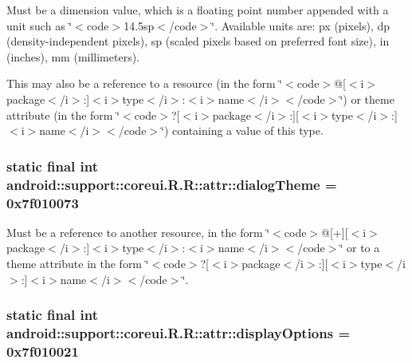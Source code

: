 Must be a dimension value, which is a floating point number appended with a unit such as \char`\"{}$<$code$>$14.5sp$<$/code$>$\char`\"{}. Available units are: px (pixels), dp (density-independent pixels), sp (scaled pixels based on preferred font size), in (inches), mm (millimeters). 

This may also be a reference to a resource (in the form \char`\"{}$<$code$>$@\mbox{[}$<$i$>$package$<$/i$>$:\mbox{]}$<$i$>$type$<$/i$>$:$<$i$>$name$<$/i$>$$<$/code$>$\char`\"{}) or theme attribute (in the form \char`\"{}$<$code$>$?\mbox{[}$<$i$>$package$<$/i$>$:\mbox{]}\mbox{[}$<$i$>$type$<$/i$>$:\mbox{]}$<$i$>$name$<$/i$>$$<$/code$>$\char`\"{}) containing a value of this type. \hypertarget{classandroid_1_1support_1_1coreui_1_1_r_1_1attr_c1a4a47c3610620157e83b571db613c9}{
\subsubsection[{dialogTheme}]{\setlength{\rightskip}{0pt plus 5cm}static final int android::support::coreui.R.R::attr::dialogTheme = 0x7f010073}}
\label{classandroid_1_1support_1_1coreui_1_1_r_1_1attr_c1a4a47c3610620157e83b571db613c9}


Must be a reference to another resource, in the form \char`\"{}$<$code$>$@\mbox{[}+\mbox{]}\mbox{[}$<$i$>$package$<$/i$>$:\mbox{]}$<$i$>$type$<$/i$>$:$<$i$>$name$<$/i$>$$<$/code$>$\char`\"{} or to a theme attribute in the form \char`\"{}$<$code$>$?\mbox{[}$<$i$>$package$<$/i$>$:\mbox{]}\mbox{[}$<$i$>$type$<$/i$>$:\mbox{]}$<$i$>$name$<$/i$>$$<$/code$>$\char`\"{}. \hypertarget{classandroid_1_1support_1_1coreui_1_1_r_1_1attr_9fbab2356d80c2e9a80f3a20939f3686}{
\subsubsection[{displayOptions}]{\setlength{\rightskip}{0pt plus 5cm}static final int android::support::coreui.R.R::attr::displayOptions = 0x7f010021}}
\label{classandroid_1_1support_1_1coreui_1_1_r_1_1attr_9fbab2356d80c2e9a80f3a20939f3686}


